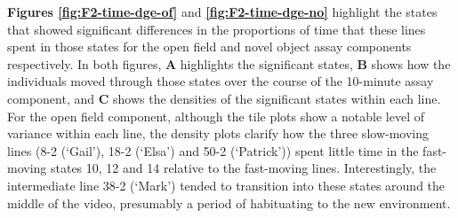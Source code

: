\documentclass[
]{book}
\begin{document}
\textbf{Figures \ref{fig:F2-time-dge-of}} and \textbf{\ref{fig:F2-time-dge-no}} highlight the states that showed significant differences in the proportions of time that these lines spent in those states for the open field and novel object assay components respectively. In both figures, \textbf{A} highlights the significant states, \textbf{B} shows how the individuals moved through those states over the course of the 10-minute assay component, and \textbf{C} shows the densities of the significant states within each line. For the open field component, although the tile plots show a notable level of variance within each line, the density plots clarify how the three slow-moving lines (\textcolor{8-2 (‘Gail’)_FF699C}{8-2 (‘Gail’)}, \textcolor{18-2 (‘Elsa’)_FF66A6}{18-2 (‘Elsa’)} and \textcolor{50-2 (‘Patrick’)_BB81FF}{50-2 (‘Patrick’)}) spent little time in the fast-moving states 10, 12 and 14 relative to the fast-moving lines. Interestingly, the intermediate line \textcolor{38-2 (‘Mark’)_00C08B}{38-2 (‘Mark’)} tended to transition into these states around the middle of the video, presumably a period of habituating to the new environment.
\end{document}

